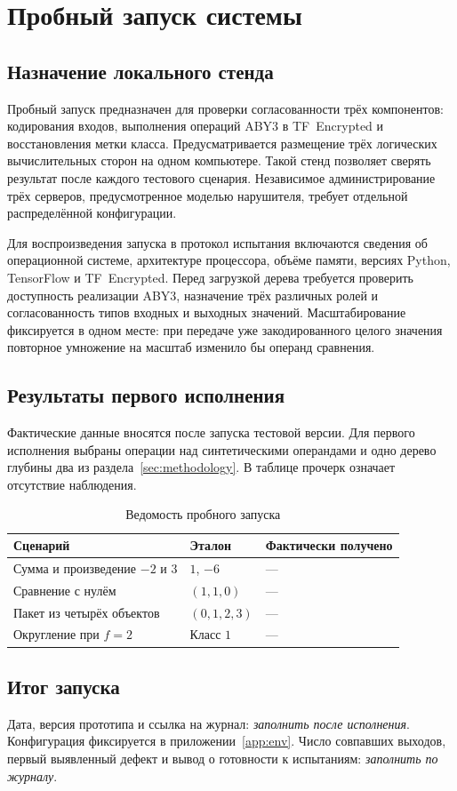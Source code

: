 \section{Пробный запуск системы}
\label{sec:trial}

\subsection{Назначение локального стенда}

Пробный запуск предназначен для проверки согласованности трёх компонентов:
кодирования входов, выполнения операций ABY3 в TF~Encrypted и
восстановления метки класса. Предусматривается размещение трёх логических
вычислительных сторон на одном компьютере. Такой стенд позволяет сверять
результат после каждого тестового сценария. Независимое администрирование
трёх серверов, предусмотренное моделью нарушителя, требует отдельной
распределённой конфигурации.

Для воспроизведения запуска в протокол испытания включаются сведения
об операционной системе, архитектуре процессора, объёме памяти, версиях
Python, TensorFlow и TF~Encrypted. Перед загрузкой дерева требуется
проверить доступность реализации ABY3, назначение трёх различных ролей
и согласованность типов входных и выходных значений. Масштабирование
фиксируется в одном месте: при передаче уже закодированного целого значения
повторное умножение на масштаб изменило бы операнд сравнения.

\subsection{Результаты первого исполнения}

Фактические данные вносятся после запуска тестовой версии. Для первого исполнения выбраны операции над синтетическими операндами и одно дерево глубины два из раздела~\ref{sec:methodology}. В таблице прочерк означает отсутствие наблюдения.

\begin{table}[htbp]
\caption{Ведомость пробного запуска}
\centering\small
\begin{tabularx}{\linewidth}{|X|X|X|}
\hline
Сценарий & Эталон & Фактически получено \\ \hline
Сумма и произведение $-2$ и $3$ & $1$, $-6$ & --- \\ \hline
Сравнение с нулём & $(1,1,0)$ & --- \\ \hline
Пакет из четырёх объектов & $(0,1,2,3)$ & --- \\ \hline
Округление при $f=2$ & Класс $1$ & --- \\ \hline
\end{tabularx}
\end{table}

\subsection{Итог запуска}

Дата, версия прототипа и ссылка на журнал: \emph{заполнить после исполнения}. Конфигурация фиксируется в приложении~\ref{app:env}. Число совпавших выходов, первый выявленный дефект и вывод о готовности к испытаниям: \emph{заполнить по журналу}.

